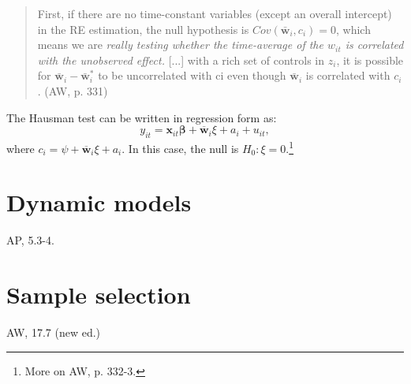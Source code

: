 \documentclass[11pt, a4paper]{report}
\theoremstyle{plain}
\theoremstyle{plain}
\theoremstyle{remark}
\begin{document}
\begin{quote}
    First, if there are no time-constant
variables (except an overall intercept) in the RE estimation, the null hypothesis is
$Cov(\bar{\mathbf{w}}_i, c_i) = 0$, which means we are \textit{really testing whether the time-average of the $w_{it}$
is correlated with the unobserved effect.} [...] with a rich set of controls in $z_i$, it is possible for $\bar{\mathbf{w}}_i - \bar{\mathbf{w}}_i^*$ to be uncorrelated with
ci even though $\bar{\mathbf{w}}_i$ is correlated with $c_i$. (AW, p. 331)
\end{quote}

The Hausman test can be written in regression form as: 
\begin{equation}
    y_{i t}=\mathbf{x}_{i t} \boldsymbol{\beta}+\overline{\mathbf{w}}_{i} \xi+a_{i}+u_{i t},
    \end{equation}
where $c_{i}=\psi+\overline{\mathbf{w}}_{i} \xi+a_{i}.$ In this case, the null is $H_0: \xi = 0$.\footnote{More on AW, p. 332-3.} 




\chapter{Dynamic models}

AP, 5.3-4.



\chapter{Sample selection}

AW, 17.7 (new ed.)
\end{document}
